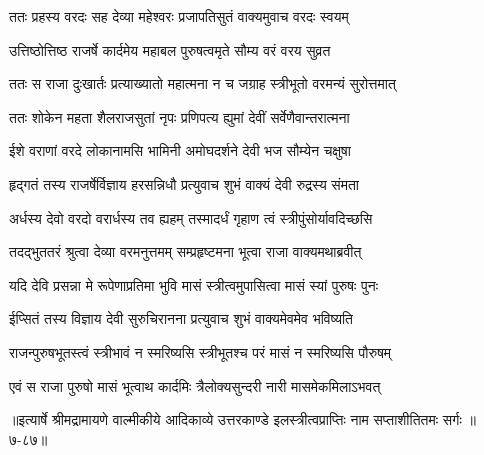 \twolineshloka
{ततः प्रहस्य वरदः सह देव्या महेश्वरः}
{प्रजापतिसुतं वाक्यमुवाच वरदः स्वयम्} %

\twolineshloka
{उत्तिष्ठोत्तिष्ठ राजर्षे कार्दमेय महाबल}
{पुरुषत्वमृते सौम्य वरं वरय सुव्रत} %

\twolineshloka
{ततः स राजा दुःखार्तः प्रत्याख्यातो महात्मना}
{न च जग्राह स्त्रीभूतो वरमन्यं सुरोत्तमात्} %

\twolineshloka
{ततः शोकेन महता शैलराजसुतां नृपः}
{प्रणिपत्य ह्युमां देवीं सर्वेणैवान्तरात्मना} %

\twolineshloka
{ईशे वराणां वरदे लोकानामसि भामिनी}
{अमोघदर्शने देवी भज सौम्येन चक्षुषा} %

\twolineshloka
{हृद्गतं तस्य राजर्षेर्विज्ञाय हरसन्निधौ}
{प्रत्युवाच शुभं वाक्यं देवी रुद्रस्य संमता} %

\twolineshloka
{अर्धस्य देवो वरदो वरार्धस्य तव ह्यहम्}
{तस्मादर्धं गृहाण त्वं स्त्रीपुंसोर्यावदिच्छसि} %

\twolineshloka
{तदद्भुततरं श्रुत्वा देव्या वरमनुत्तमम्}
{सम्प्रहृष्टमना भूत्वा राजा वाक्यमथाब्रवीत्} %

\twolineshloka
{यदि देवि प्रसन्ना मे रूपेणाप्रतिमा भुवि}
{मासं स्त्रीत्वमुपासित्वा मासं स्यां पुरुषः पुनः} %

\twolineshloka
{ईप्सितं तस्य विज्ञाय देवी सुरुचिरानना}
{प्रत्युवाच शुभं वाक्यमेवमेव भविष्यति} %

\twolineshloka
{राजन्पुरुषभूतस्त्वं स्त्रीभावं न स्मरिष्यसि}
{स्त्रीभूतश्च परं मासं न स्मरिष्यसि पौरुषम्} %

\twolineshloka
{एवं स राजा पुरुषो मासं भूत्वाथ कार्दमिः}
{त्रैलोक्यसुन्दरी नारी मासमेकमिलाऽभवत्} %


॥इत्यार्षे श्रीमद्रामायणे वाल्मीकीये आदिकाव्ये उत्तरकाण्डे इलस्त्रीत्वप्राप्तिः नाम सप्ताशीतितमः सर्गः ॥७-८७॥
